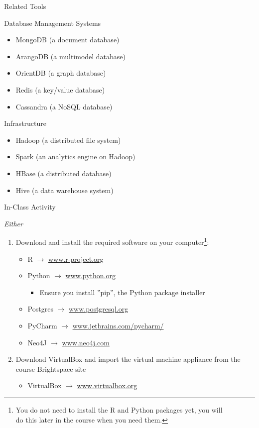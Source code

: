 \documentclass[ignorenonframetext,xcolor=dvipsnames]{beamer}
\begin{document}
\begin{frame}{Related Tools}
\begin{block}{Database Management Systems}
  \begin{itemize}
    \item MongoDB (a document database)
    \item ArangoDB (a multimodel database)
    \item OrientDB (a graph database)
    \item Redis (a key/value database)
    \item Cassandra (a NoSQL database)
  \end{itemize}
\end{block}
\begin{block}{Infrastructure}
  \begin{itemize}
     \item Hadoop (a distributed file system)
     \item Spark (an analytics engine on Hadoop)
     \item HBase (a distributed database)
     \item Hive (a data warehouse system)
  \end{itemize}
\end{block}
\end{frame}

\begin{frame}{In-Class Activity}

\emph{Either}
\begin{enumerate}
\item Download and install the required software on your computer\footnote{You do not need to install the R and Python packages yet, you will\\ do this later in the course when you need them.}:
	\begin{itemize}
		\item R $\rightarrow$ \url{www.r-project.org}
		\item Python $\rightarrow$ \url{www.python.org}
			\begin{itemize}
			  \item Ensure you install ''pip'', the Python package installer
			\end{itemize}
		\item Postgres $\rightarrow$ \url{www.postgresql.org}
		\item PyCharm $\rightarrow$ \url{www.jetbrains.com/pycharm/} \\
		\item Neo4J $\rightarrow$ \url{www.neo4j.com}
	\end{itemize}
\item Download VirtualBox and import the virtual machine appliance from the course Brightspace site
	\begin{itemize}
		\item VirtualBox $\rightarrow$ \url{www.virtualbox.org}
	\end{itemize}
\end{enumerate}

\end{frame}
\end{document}
